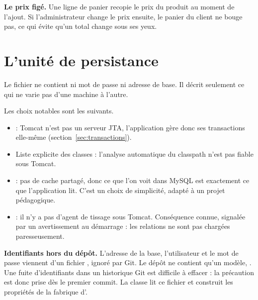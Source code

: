 \textbf{Le prix figé.} Une ligne de panier recopie le prix du produit au moment de l'ajout. Si l'administrateur
change le prix ensuite, le panier du client ne bouge pas, ce qui évite qu'un total change sous ses yeux.

\section{L'unité de persistance}
Le fichier  ne contient ni mot de passe ni adresse de base. Il décrit seulement ce qui ne varie
pas d'une machine à l'autre.



Les choix notables sont les suivants.
\begin{itemize}
  \item {} : Tomcat n'est pas un serveur JTA, l'application gère donc ses transactions
        elle-même (section~\ref{sec:transactions}).
  \item Liste explicite des classes : l'analyse automatique du classpath n'est pas fiable sous Tomcat.
  \item {} : pas de cache partagé, donc ce que l'on voit dans MySQL est exactement ce que
        l'application lit. C'est un choix de simplicité, adapté à un projet pédagogique.
  \item {} : il n'y a pas d'agent de tissage sous Tomcat. Conséquence connue,
        signalée par un avertissement au démarrage : les relations  ne sont pas chargées
        paresseusement.
\end{itemize}

\textbf{Identifiants hors du dépôt.} L'adresse de la base, l'utilisateur et le mot de passe viennent d'un fichier
, ignoré par Git. Le dépôt ne contient qu'un modèle, . Une fuite d'identifiants
dans un historique Git est difficile à effacer : la précaution est donc prise dès le premier commit. La classe
 lit ce fichier et construit les propriétés de la fabrique d'.

